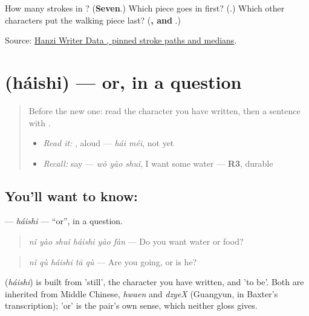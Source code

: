 \begin{tcolorbox}[breakable,colback=teal!4,colframe=teal!35!black,title={Before you move on}]
How many strokes in ? (\textbf{Seven}.) Which piece goes in first? (\textbf{}.) Which other characters put the walking piece last? (\textbf{,  and }.)

Source: \href{https://raw.githubusercontent.com/chanind/hanzi-writer-data/68d10a4b21150cae5e1ebbd223eed289cf32d90c/data/\%E8\%BF\%98.json}{Hanzi Writer Data , pinned stroke paths and medians}.
\end{tcolorbox}
\section[\texorpdfstring{\zh{还是} (háishi)}{还是 (háishi)}]{ (háishi) — or, in a question}

\label{lesson:ZH-C154-haishi}



\begin{quote}
Before the new one: read the character you have written, then a sentence with .

\begin{itemize}
\raggedright
  \item \emph{Read it:} , aloud — \emph{hái méi}, not yet
  \item \emph{Recall:} say  — \emph{wǒ yào shuǐ}, I want some water — \textbf{R3}, durable
\end{itemize}
\end{quote}

\subsection*{You'll want to know: }
\textbf{} — \emph{háishi} — \textquotedblleft{}or\textquotedblright{}, in a question.

\begin{quote}
\textbf{} \emph{nǐ yào shuǐ háishi yào fàn} — Do you want water or food?
\end{quote}

\begin{quote}
\textbf{} \emph{nǐ qù háishi tā qù} — Are you going, or is he?
\end{quote}

\begin{cousinweb}
\textbf{} (\emph{háishi}) is built from  'still', the character you have written, and  'to be'. Both are inherited from Middle Chinese, \emph{hwaen} and \emph{dzyeX} (Guangyun, in Baxter's transcription); 'or' is the pair's own sense, which neither gloss gives.
\end{cousinweb}


